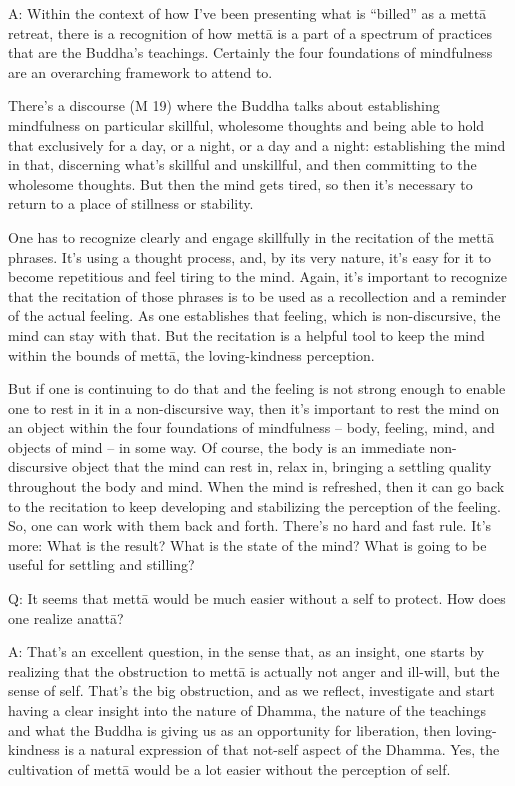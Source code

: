 \qaspace
A: Within the context of how I’ve been presenting what is “billed” as a
mettā retreat, there is a recognition of how mettā is a part of a
spectrum of practices that are the Buddha’s teachings. Certainly the
four foundations of mindfulness are an overarching framework to attend
to.

There’s a discourse (M 19) where the Buddha talks about establishing
mindfulness on particular skillful, wholesome thoughts and being able to
hold that exclusively for a day, or a night, or a day and a night:
establishing the mind in that, discerning what’s skillful and
unskillful, and then committing to the wholesome thoughts. But then the
mind gets tired, so then it’s necessary to return to a place of
stillness or stability.

One has to recognize clearly and engage skillfully in the recitation of
the mettā phrases. It’s using a thought process, and, by its very
nature, it’s easy for it to become repetitious and feel tiring to the
mind. Again, it’s important to recognize that the recitation of those
phrases is to be used as a recollection and a reminder of the actual
feeling. As one establishes that feeling, which is non-discursive, the
mind can stay with that. But the recitation is a helpful tool to keep
the mind within the bounds of mettā, the loving-kindness perception.

But if one is continuing to do that and the feeling is not strong enough
to enable one to rest in it in a non-discursive way, then it’s important
to rest the mind on an object within the four foundations of mindfulness
– body, feeling, mind, and objects of mind – in some way. Of course, the
body is an immediate non-discursive object that the mind can rest in,
relax in, bringing a settling quality throughout the body and mind. When
the mind is refreshed, then it can go back to the recitation to keep
developing and stabilizing the perception of the feeling. So, one can
work with them back and forth. There’s no hard and fast rule. It’s more:
What is the result? What is the state of the mind? What is going to be
useful for settling and stilling?

\qaspace
Q: It seems that mettā would be much easier without a self to protect.
How does one realize anattā?

\qaspace
A: That’s an excellent question, in the sense that, as an insight, one
starts by realizing that the obstruction to mettā is actually not anger
and ill-will, but the sense of self. That’s the big obstruction, and as
we reflect, investigate and start having a clear insight into the nature
of Dhamma, the nature of the teachings and what the Buddha is giving us
as an opportunity for liberation, then loving-kindness is a natural
expression of that not-self aspect of the Dhamma. Yes, the cultivation
of mettā would be a lot easier without the perception of self.

